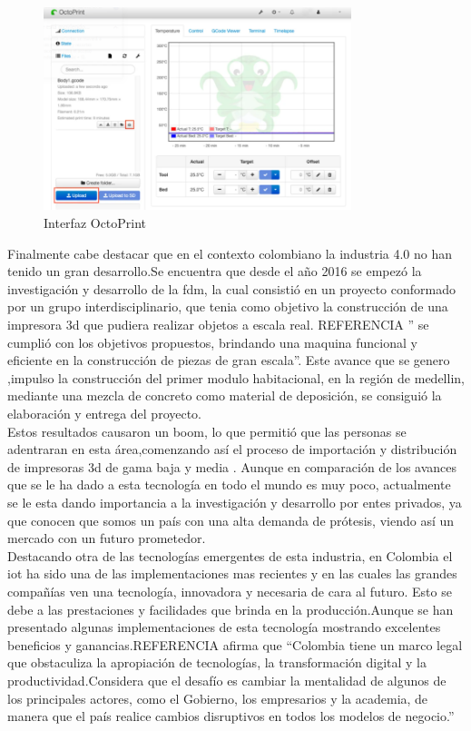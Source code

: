 \begin{figure}[H]
    \centering
    \includegraphics[width=0.8\textwidth]{Figs/octoprint.PNG}
    \caption{Interfaz OctoPrint\citep{} }
     \label{fig:octo}
\end{figure}

Finalmente cabe destacar que en el contexto colombiano la industria 4.0 no han tenido un gran desarrollo.Se encuentra que desde el año 2016 se empezó la investigación y desarrollo de la \acrshort{fdm}, la cual consistió en un proyecto conformado por un grupo interdisciplinario, que tenia como objetivo la construcción de una impresora 3d que pudiera realizar objetos a escala real. REFERENCIA '' se cumplió con los objetivos propuestos, brindando una maquina funcional y eficiente en la construcción de piezas de gran escala''. Este avance que se genero ,impulso la  construcción del primer modulo habitacional, en la región de medellin, mediante una mezcla de concreto como material de deposición, se consiguió la elaboración y entrega del proyecto.\\

Estos resultados causaron un boom, lo que permitió que las personas se adentraran en esta área,comenzando así el proceso de importación y distribución de impresoras 3d de gama baja y media . Aunque en comparación de los avances que se le ha dado a esta tecnología en todo el mundo es muy poco, actualmente se le esta dando importancia a la investigación y desarrollo por entes privados, ya que conocen que somos un país con una alta demanda de prótesis, viendo así un mercado con un futuro prometedor.\\

Destacando otra de las tecnologías emergentes de esta industria, en Colombia el \acrshort{iot} ha sido una de las implementaciones mas recientes y en las cuales las grandes compañías ven una tecnología, innovadora y necesaria de cara al futuro. Esto se debe a las prestaciones y facilidades que brinda en la producción.Aunque se han presentado algunas implementaciones de esta tecnología mostrando excelentes beneficios y ganancias.\citep{}REFERENCIA afirma que “Colombia tiene un marco legal que obstaculiza la apropiación de tecnologías, la transformación digital y la productividad.Considera que el desafío es cambiar la mentalidad de algunos de los principales actores, como el Gobierno, los empresarios y la academia, de manera que el país realice cambios disruptivos en todos los modelos de negocio.''\\

